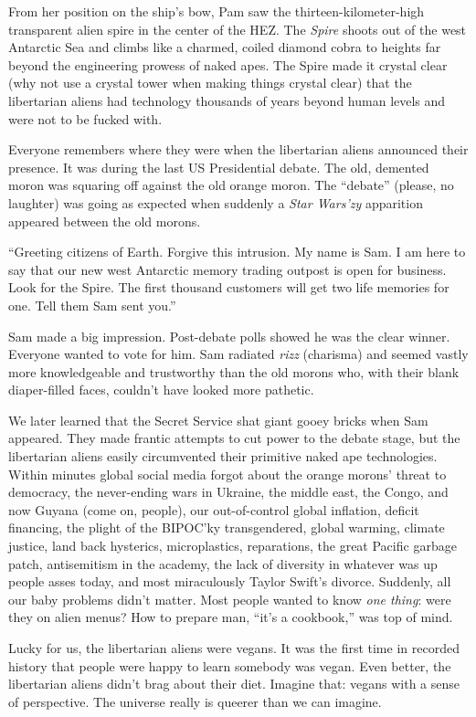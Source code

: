 From her position on the ship's bow, Pam saw the thirteen-kilometer-high
transparent alien spire in the center of the HEZ. The \emph{Spire}
shoots out of the west Antarctic Sea and climbs like a charmed, coiled
diamond cobra to heights far beyond the engineering prowess of naked
apes. The Spire made it crystal clear (why not use a crystal tower when
making things crystal clear) that the libertarian aliens had technology
thousands of years beyond human levels and were not to be fucked with.

Everyone remembers where they were when the libertarian aliens announced
their presence. It was during the last US Presidential debate. The old,
demented moron was squaring off against the old orange moron. The
``debate'' (please, no laughter) was going as expected when suddenly a
\emph{Star Wars'zy} apparition appeared between the old morons.

``Greeting citizens of Earth. Forgive this intrusion. My name is Sam. I
am here to say that our new west Antarctic memory trading outpost is
open for business. Look for the Spire. The first thousand customers will
get two life memories for one. Tell them Sam sent you.''

Sam made a big impression. Post-debate polls showed he was the clear
winner. Everyone wanted to vote for him. Sam radiated \emph{rizz}
(charisma) and seemed vastly more knowledgeable and trustworthy than the
old morons who, with their blank diaper-filled faces, couldn't have
looked more pathetic.~

We later learned that the Secret Service shat giant gooey bricks when
Sam appeared. They made frantic attempts to cut power to the debate
stage, but the libertarian aliens easily circumvented their primitive
naked ape technologies. Within minutes global social media forgot about
the orange morons' threat to democracy, the never-ending wars in
Ukraine, the middle east, the Congo, and now Guyana (come on, people),
our out-of-control global inflation, deficit financing, the plight of
the BIPOC'ky transgendered, global warming, climate justice, land back
hysterics, microplastics, reparations, the great Pacific garbage patch,
antisemitism in the academy, the lack of diversity in whatever was up
people asses today, and most miraculously Taylor Swift's divorce.
Suddenly, all our baby problems didn't matter. Most people wanted to
know \emph{one thing}: were they on alien menus? How to prepare man,
``it's a cookbook,'' was top of mind.

Lucky for us, the libertarian aliens were vegans. It was the first time
in recorded history that people were happy to learn somebody was vegan.
Even better, the libertarian aliens didn't brag about their diet.
Imagine that: vegans with a sense of perspective. The universe really is
queerer than we can imagine.

